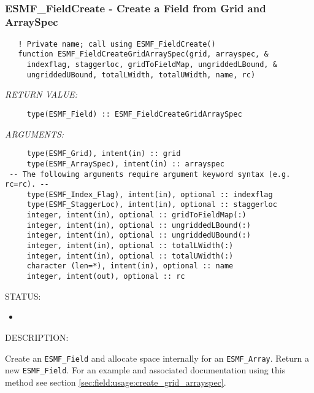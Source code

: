 \mbox{}\hrulefill\ 
 
\subsubsection [ESMF\_FieldCreate] {ESMF\_FieldCreate - Create a Field from Grid and ArraySpec}


\begin{verbatim}   ! Private name; call using ESMF_FieldCreate()
   function ESMF_FieldCreateGridArraySpec(grid, arrayspec, &
     indexflag, staggerloc, gridToFieldMap, ungriddedLBound, &
     ungriddedUBound, totalLWidth, totalUWidth, name, rc)\end{verbatim}{\em RETURN VALUE:}
\begin{verbatim}     type(ESMF_Field) :: ESMF_FieldCreateGridArraySpec\end{verbatim}{\em ARGUMENTS:}
\begin{verbatim}     type(ESMF_Grid), intent(in) :: grid
     type(ESMF_ArraySpec), intent(in) :: arrayspec
 -- The following arguments require argument keyword syntax (e.g. rc=rc). --
     type(ESMF_Index_Flag), intent(in), optional :: indexflag
     type(ESMF_StaggerLoc), intent(in), optional :: staggerloc
     integer, intent(in), optional :: gridToFieldMap(:)
     integer, intent(in), optional :: ungriddedLBound(:)
     integer, intent(in), optional :: ungriddedUBound(:)
     integer, intent(in), optional :: totalLWidth(:)
     integer, intent(in), optional :: totalUWidth(:)
     character (len=*), intent(in), optional :: name
     integer, intent(out), optional :: rc\end{verbatim}
{\sf STATUS:}
   \begin{itemize}
   \item{}
   \end{itemize}
  
{\sf DESCRIPTION:\\ }


   Create an {\tt ESMF\_Field} and allocate space internally for an
   {\tt ESMF\_Array}. Return a new {\tt ESMF\_Field}. For an example and
   associated documentation using this method see section
   \ref{sec:field:usage:create_grid_arrayspec}.
  
